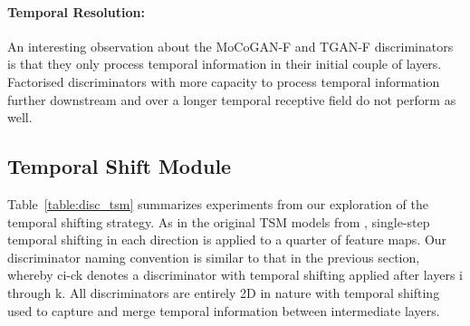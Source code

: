 \documentclass[a4paper,fleqn]{cas-sc}
\begin{document}
\paragraph{Temporal Resolution:} An interesting observation about the MoCoGAN-F and TGAN-F discriminators is that they only process temporal information in their initial couple of layers. Factorised discriminators with more capacity to process temporal information further downstream and over a longer temporal receptive field do not perform as well. 

\subsection{Temporal Shift Module}
Table~\ref{table:disc_tsm} summarizes experiments from our exploration of the temporal shifting strategy. As in the original TSM models from \citet{linGHtsm}, single-step temporal shifting in each direction is applied  to a quarter of feature maps. Our discriminator naming convention is similar to that in the previous section, whereby ci-ck denotes a discriminator with temporal shifting applied after layers i through k. All discriminators are entirely 2D in nature with temporal shifting used to capture and merge temporal information between intermediate layers.
\end{document}
